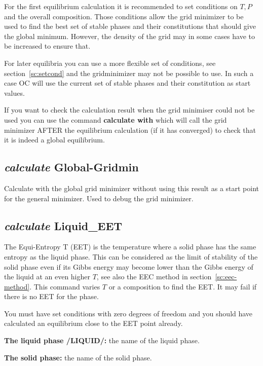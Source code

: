 \documentclass[11pt]{article}
\begin{document}
For the first equilibrium calculation it is recommended to set
conditions on $T, P$ and the overall composition.  Those conditions
allow the grid minimizer to be used to find the best set of stable
phases and their constitutions that should give the global minimum.
However, the density of the grid may in some cases have to be
increased to ensure that.

For later equilibria you can use a more flexible set of conditions,
see section~\ref{sc:setcond} and the gridminimizer may not be possible
to use.  In such a case OC will use the current set of stable phases
and their constitution as start values.

If you want to check the calculation result when the grid minimiser
could not be used you can use the command {\bf calculate with} which
will call the grid minimizer AFTER the equilibrium calculation (if it
has converged) to check that it is indeed a global equilibrium.

\subsection{{\em calculate} Global-Gridmin}
\hypertarget{Calculate global-gridmin}{}

Calculate with the global grid minimizer without using this result as a
start point for the general minimizer.  Used to debug the grid
minimizer.

\hypertarget{EET}{}
\subsection{{\em calculate} Liquid\_EET}

The Equi-Entropy T (EET) is the temperature where a solid phase has
the same entropy as the liquid phase.  This can be considered as the
limit of stability of the solid phase even if its Gibbs energy may
become lower than the Gibbs energy of the liquid at an even higher
$T$, see also the EEC method in section~\ref{sc:eec-method}.  This
command varies $T$ or a composition to find the EET.  It may fail if
there is no EET for the phase.

You must have set conditions with zero degrees of freedom and you
should have calculated an equilibrium close to the EET point already.

{\bf The liquid phase /LIQUID/:} the name of the liquid phase.

{\bf The solid phase:} the name of the solid phase.
\end{document}
